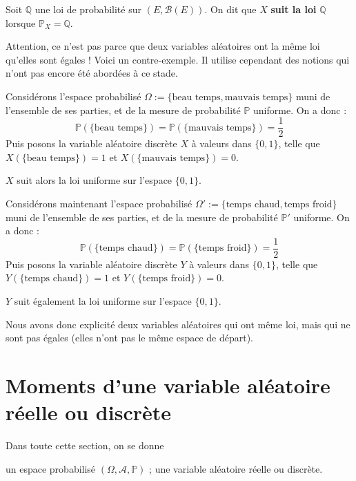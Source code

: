 \documentclass[../integ-proba.tex]{subfiles}
\begin{document}
\begin{defi}
    Soit $\mathbb{Q}$ une loi de probabilité sur $\left(E, \mathcal{B}(E) \right)$.
    On dit que $X$ \textbf{suit la loi} $\mathbb{Q}$ lorsque $\mathbb{P}_X = \mathbb{Q}$.
\end{defi}

\begin{rem}
    Attention, ce n'est pas parce que deux variables aléatoires ont la même loi qu'elles sont égales !
    Voici un contre-exemple. Il utilise cependant des notions qui n'ont pas encore été abordées à ce stade.
    
    Considérons l'espace probabilisé $\Omega := \{\text{beau temps}, \text{mauvais temps}\}$ muni de l'ensemble de ses parties, et de la mesure de probabilité $\mathbb{P}$ uniforme.
    On a donc :
    $$
    \mathbb{P}(\{\text{beau temps}\}) = \mathbb{P}(\{\text{mauvais temps}\}) = \frac{1}{2}
    $$
    Puis posons la variable aléatoire discrète $X$ à valeurs dans $\{0,1\}$, telle que $X(\{\text{beau temps}\})=1$ et $X(\{\text{mauvais temps}\})=0$.
    
    $X$ suit alors la loi uniforme sur l'espace $\{0,1\}$.

    Considérons maintenant l'espace probabilisé $\Omega' := \{\text{temps chaud}, \text{temps froid}\}$ muni de l'ensemble de ses parties, et de la mesure de probabilité $\mathbb{P}'$ uniforme.
    On a donc :
    $$
    \mathbb{P}(\{\text{temps chaud}\}) = \mathbb{P}(\{\text{temps froid}\}) = \frac{1}{2}
    $$
    Puis posons la variable aléatoire discrète $Y$ à valeurs dans $\{0,1\}$, telle que $Y(\{\text{temps chaud}\})=1$ et $Y(\{\text{temps froid}\})=0$.

    $Y$ suit également la loi uniforme sur l'espace $\{0,1\}$.

    Nous avons donc explicité deux variables aléatoires qui ont même loi, mais qui ne sont pas égales (elles n'ont pas le même espace de départ).
\end{rem}

\section{Moments d'une variable aléatoire réelle ou discrète}

Dans toute cette section, on se donne
\begin{itemize}
    \itemb un espace probabilisé $\left(\Omega, \mathcal{A}, \mathbb{P}\right)$ ;
    \itemb une variable aléatoire réelle ou discrète.
\end{itemize}
\end{document}
